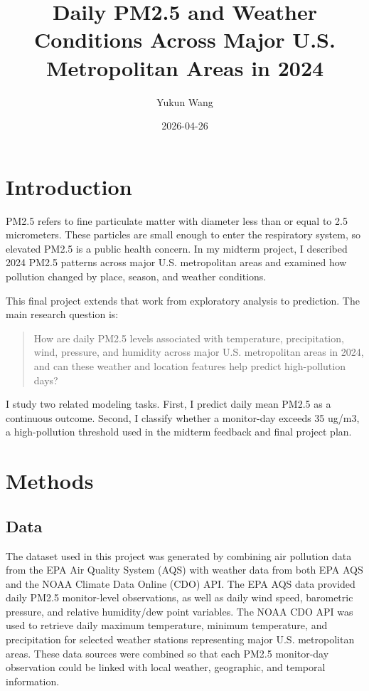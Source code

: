 \documentclass[
  letterpaper,
  DIV=11,
  numbers=noendperiod]{scrartcl}
\title{Daily PM2.5 and Weather Conditions Across Major U.S. Metropolitan
Areas in 2024}
\author{Yukun Wang}
\date{2026-04-26}
\begin{document}
\maketitle


\section{Introduction}\label{introduction}

PM2.5 refers to fine particulate matter with diameter less than or equal
to 2.5 micrometers. These particles are small enough to enter the
respiratory system, so elevated PM2.5 is a public health concern. In my
midterm project, I described 2024 PM2.5 patterns across major U.S.
metropolitan areas and examined how pollution changed by place, season,
and weather conditions.

This final project extends that work from exploratory analysis to
prediction. The main research question is:

\begin{quote}
How are daily PM2.5 levels associated with temperature, precipitation,
wind, pressure, and humidity across major U.S. metropolitan areas in
2024, and can these weather and location features help predict
high-pollution days?
\end{quote}

I study two related modeling tasks. First, I predict daily mean PM2.5 as
a continuous outcome. Second, I classify whether a monitor-day exceeds
35 ug/m3, a high-pollution threshold used in the midterm feedback and
final project plan.

\section{Methods}\label{methods}

\subsection{Data}\label{data}

The dataset used in this project was generated by combining air
pollution data from the EPA Air Quality System (AQS) with weather data
from both EPA AQS and the NOAA Climate Data Online (CDO) API. The EPA
AQS data provided daily PM2.5 monitor-level observations, as well as
daily wind speed, barometric pressure, and relative humidity/dew point
variables. The NOAA CDO API was used to retrieve daily maximum
temperature, minimum temperature, and precipitation for selected weather
stations representing major U.S. metropolitan areas. These data sources
were combined so that each PM2.5 monitor-day observation could be linked
with local weather, geographic, and temporal information.
\end{document}

